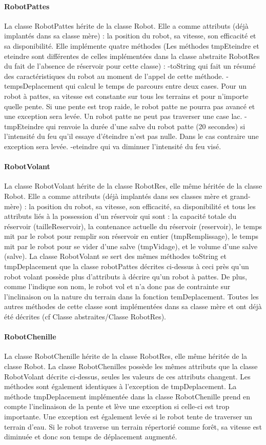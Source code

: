 \documentclass[10pt]{report}
\begin{document}
\paragraph{RobotPattes}La classe RobotPattes hérite de la classe Robot. Elle a comme attributs (déjà implantés dans sa classe mère) : la position du robot, sa vitesse, son efficacité et sa disponibilité.
 Elle implémente quatre méthodes (Les méthodes tmpEteindre et eteindre sont différentes de celles implémentées dans la classe abstraite RobotRes du fait de l'absence de réservoir pour cette classe) :
 -toString qui fait un résumé des caractéristiques du robot au moment de l'appel de cette méthode.
 -tempsDeplacement qui calcul le temps de parcours entre deux cases. Pour un robot à pattes, sa vitesse est constante sur tous les terrains et pour n'importe quelle pente. Si une pente est trop raide, le robot patte ne pourra pas avancé et une exception sera levée. Un robot patte ne peut pas traverser une case lac.
 -tmpEteindre qui renvoie la durée d'une salve du robot patte (20 secondes) si l'intensité du feu qu'il essaye d'éteindre n'est pas nulle. Dans le cas contraire une exception sera levée.
 -eteindre qui va diminuer l'intensité du feu visé.
\paragraph{RobotVolant}La classe RobotVolant hérite de la classe RobotRes, elle même héritée de la classe Robot. Elle a comme attributs (déjà implantés dans ses classes mère et grand-mère) : la position du robot, sa vitesse, son efficacité, sa disponibilité et tous les attributs liés à la possession d'un réservoir qui sont : la capacité totale du réservoir (tailleReservoir), la contenance actuelle du réservoir (reservoir), le temps mit par le robot pour remplir son réservoir en entier (tmpRemplissage), le temps mit par le robot pour se vider d'une salve (tmpVidage), et le volume d'une salve (salve).
 La classe RobotVolant se sert des mêmes méthodes toString et tmpDeplacement que la classe robotPattes décrites ci-dessus à ceci près qu'un robot volant possède plus d'attributs à décrire qu'un robot à pattes. De plus, comme l'indique son nom, le robot vol et n'a donc pas de contrainte sur l'inclinaison ou la nature du terrain dans la fonction temDeplacement.
 Toutes les autres méthodes de cette classe sont implémentées dans sa classe mère et ont déjà été décrites (cf Classe abstraites/Classe RobotRes).
\paragraph{RobotChenille}La classe RobotChenille hérite de la classe RobotRes, elle même héritée de la classe Robot. La classe RobotChenilles possède les mêmes attributs que la classe RobotVolant décrite ci-dessus, seules les valeurs de ces attributs changent.
 Les méthodes sont également identiques à l'exception de tmpDeplacement. La méthode tmpDeplacement implémentée dans la classe RobotChenille prend en compte l'inclinaison de la pente et lève une exception si celle-ci est trop importante. Une exception est également levée si le robot tente de traverser un terrain d'eau. Si le robot traverse un terrain répertorié comme forêt, sa vitesse est diminuée et donc son temps de déplacement augmenté.
\end{document}
